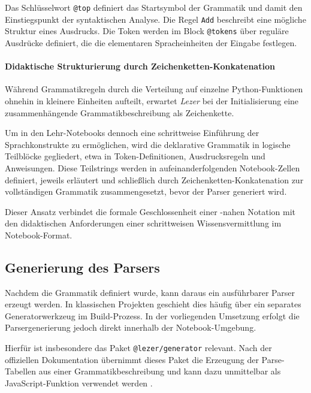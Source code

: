 Das Schlüsselwort \texttt{@top} definiert das Startsymbol der Grammatik und damit den Einstiegspunkt der syntaktischen Analyse. Die Regel \texttt{Add} beschreibt eine mögliche Struktur eines Ausdrucks. Die Token werden im Block \texttt{@tokens} über reguläre Ausdrücke definiert, die die elementaren Spracheinheiten der Eingabe festlegen.

\paragraph{Didaktische Strukturierung durch Zeichenketten-Konkatenation}

Während \emph{} Grammatikregeln durch die Verteilung auf einzelne Python-Funk\-tionen ohnehin in kleinere Einheiten aufteilt, erwartet \emph{Lezer} bei der Initialisierung eine zusammenhängende Grammatikbeschreibung als Zeichenkette.

Um in den Lehr-Notebooks dennoch eine schrittweise Einführung der Sprachkonstrukte zu ermöglichen, wird die deklarative Grammatik in logische Teilblöcke gegliedert, etwa in Token-Definitionen, Ausdrucksregeln und Anweisungen. Diese Teilstrings werden in aufeinanderfolgenden Notebook-Zellen definiert, jeweils erläutert und schließlich durch Zeichenketten-Konkatenation zur vollständigen Grammatik zusammengesetzt, bevor der Parser generiert wird.

Dieser Ansatz verbindet die formale Geschlossenheit einer -nahen Notation mit den didaktischen Anforderungen einer schrittweisen Wissensvermittlung im Notebook-Format.

\subsection{Generierung des Parsers}
\label{subsec:lezer_parser_generation}

Nachdem die Grammatik definiert wurde, kann daraus ein ausführbarer Parser erzeugt werden. In klassischen Projekten geschieht dies häufig über ein separates Generatorwerkzeug im Build-Prozess. In der vorliegenden Umsetzung erfolgt die Parsergenerierung jedoch direkt innerhalb der Notebook-Umgebung.

Hierfür ist insbesondere das Paket \texttt{@lezer/generator} relevant. Nach der offiziellen Dokumentation übernimmt dieses Paket die Erzeugung der Parse-Tabellen aus einer Grammatikbeschreibung und kann dazu unmittelbar als JavaScript-Funktion verwendet werden \autocite{lezer_docs}.

